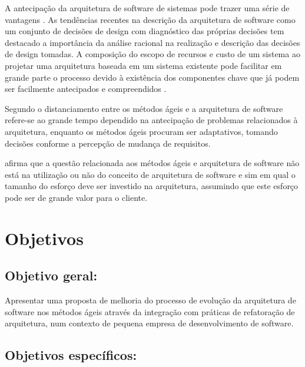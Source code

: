A antecipação da arquitetura de software de sistemas pode trazer uma série de vantagens \cite{babar2013agile}. As tendências recentes na descrição da arquitetura de software como um conjunto de decisões de design com diagnóstico das próprias decisões tem destacado a importância da análise racional na realização e descrição das decisões de design tomadas. \cite{babar2009software} A composição do escopo de recursos e custo de um sistema ao projetar uma arquitetura baseada em um sistema existente pode facilitar em grande parte o processo devido à existência dos componentes chave que já podem ser facilmente antecipados e compreendidos \cite{babar2013agile}.

Segundo \cite{abrahamsson2010agility} o distanciamento entre os métodos ágeis e a arquitetura de software refere-se ao grande tempo dependido na antecipação de problemas relacionados à arquitetura, enquanto os métodos ágeis procuram ser adaptativos, tomando decisões conforme a percepção de mudança de requisitos. 

\cite{cockburn2006agile} afirma que a questão relacionada aos métodos ágeis e arquitetura de software não está na utilização ou não do conceito de arquitetura de software e sim em qual o tamanho do esforço deve ser investido na arquitetura, assumindo que este esforço pode ser de grande valor para o cliente.

\section{Objetivos}

\subsection{Objetivo geral:}


Apresentar uma proposta de melhoria do processo de evolução da arquitetura de software nos métodos ágeis através da integração com práticas de refatoração de arquitetura, num contexto de pequena empresa de desenvolvimento de software.

\subsection{Objetivos específicos:}


